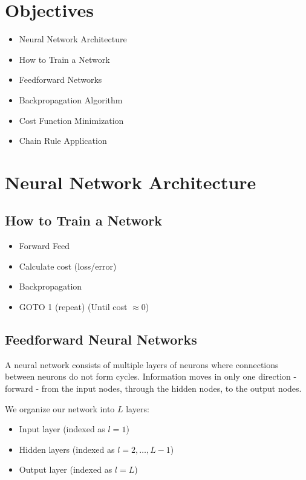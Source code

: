 
\section*{Objectives}
\begin{itemize}
    \item Neural Network Architecture
    \item How to Train a Network
    \item Feedforward Networks
    \item Backpropagation Algorithm
    \item Cost Function Minimization
    \item Chain Rule Application
\end{itemize}

\section{Neural Network Architecture}

\subsection{How to Train a Network}
\begin{itemize}
    \item Forward Feed
    \item Calculate cost (loss/error)
    \item Backpropagation
    \item GOTO 1 (repeat) (Until cost $\approx 0$)
\end{itemize}

\subsection{Feedforward Neural Networks}
A  neural network consists of multiple layers of neurons where connections between neurons do not form cycles. Information moves in only one direction - forward - from the input nodes, through the hidden nodes, to the output nodes.

We organize our network into $L$ layers:
\begin{itemize}
    \item Input layer (indexed as $l=1$)
    \item Hidden layers (indexed as $l=2, \ldots, L-1$)
    \item Output layer (indexed as $l=L$)
\end{itemize}

